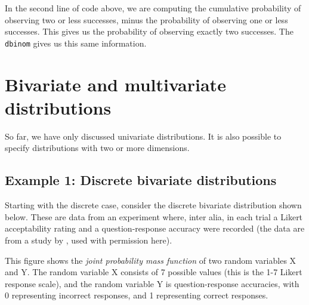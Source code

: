 \documentclass[12pt,]{krantz}
\theoremstyle{definition}
\theoremstyle{definition}
\theoremstyle{definition}
\theoremstyle{remark}
\begin{document}
In the second line of code above, we are computing the cumulative probability of observing two or less successes, minus the probability of observing one or less successes. This gives us the probability of observing exactly two successes. The \texttt{dbinom} gives us this same information.

\hypertarget{bivariate-and-multivariate-distributions}{%
\section{Bivariate and multivariate distributions}\label{bivariate-and-multivariate-distributions}}

So far, we have only discussed univariate distributions. It is also possible to specify distributions with two or more dimensions.

\hypertarget{example-1-discrete-bivariate-distributions}{%
\subsection{Example 1: Discrete bivariate distributions}\label{example-1-discrete-bivariate-distributions}}

Starting with the discrete case, consider the discrete bivariate distribution shown below. These are data from an experiment where, inter alia, in each trial a Likert acceptability rating and a question-response accuracy were recorded (the data are from a study by \citet{AnnaLphd}, used with permission here).

This figure shows the \emph{joint probability mass function} of two random variables X and Y. The random variable X consists of 7 possible values (this is the 1-7 Likert response scale), and the random variable Y is question-response accuracies, with 0 representing incorrect responses, and 1 representing correct responses.
\end{document}
